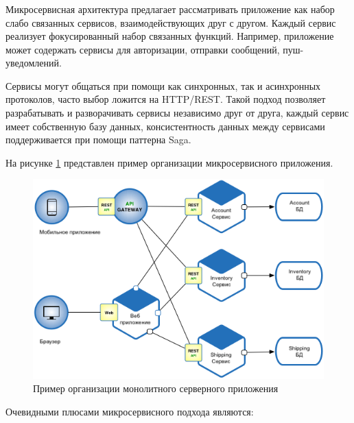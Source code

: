 \subsubsection {}
\label{sec:analysis:research:backArch:microservices}

Микросервисная архитектура предлагает рассматривать приложение как набор слабо связанных сервисов, взаимодействующих друг с другом. Каждый сервис реализует фокусированный набор связанных функций. Например, приложение может содержать сервисы для авторизации, отправки сообщений, пуш-уведомлений.

Сервисы могут общаться при помощи как синхронных, так и асинхронных протоколов, часто выбор ложится на HTTP/REST. Такой подход позволяет разрабатывать и разворачивать сервисы независимо друг от друга, каждый сервис имеет собственную базу данных, консистентность данных между сервисами поддерживается при помощи паттерна Saga. \cite{microservices:ms}

На рисунке \ref{sec:analysis:research:arch:back:micro} представлен пример организации микросервисного приложения.

\begin{figure}[h]
  \centering
    \includegraphics[width=1\textwidth]{inc/img/backend-micro.png}
  \caption{Пример организации монолитного серверного приложения}
  \label{sec:analysis:research:arch:back:micro}
\end{figure}

Очевидными плюсами микросервисного подхода являются:

